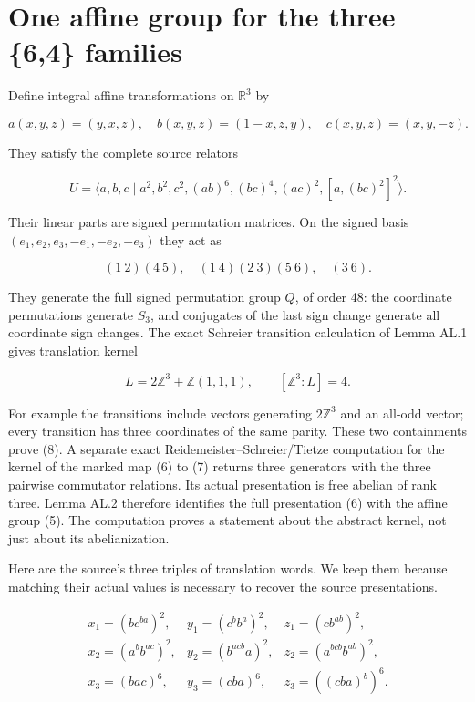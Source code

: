 \section{One affine group for the three \{6,4\} families}\label{one-affine-group-for-the-three-64-families}

Define integral affine transformations on \(\mathbb R^3\) by

\[a(x,y,z)=(y,x,z),\quad b(x,y,z)=(1-x,z,y),\quad
c(x,y,z)=(x,y,-z).\tag{5}\]

They satisfy the complete source relators

\[U=\langle a,b,c\mid a^2,b^2,c^2,(ab)^6,(bc)^4,(ac)^2,
[a,(bc)^2]^2\rangle.\tag{6}\]

Their linear parts are signed permutation matrices. On the signed basis
\((e_1,e_2,e_3,-e_1,-e_2,-e_3)\) they act as

\[ (1\ 2)(4\ 5),\quad(1\ 4)(2\ 3)(5\ 6),\quad(3\ 6).\tag{7}\]

They generate the full signed permutation group \(Q\), of order 48:
the coordinate permutations generate \(S_3\), and conjugates of the last
sign change generate all coordinate sign changes. The exact Schreier
transition calculation of Lemma AL.1 gives translation kernel

\[L=2\mathbb Z^3+\mathbb Z(1,1,1),\qquad[\mathbb Z^3:L]=4.\tag{8}\]

For example the transitions include vectors generating \(2\mathbb Z^3\)
and an all-odd vector; every transition has three coordinates of the
same parity. These two containments prove (8). A separate exact
Reidemeister--Schreier/Tietze computation for the kernel of the marked
map (6) to (7) returns three generators with the three pairwise
commutator relations. Its actual presentation is free abelian of rank
three. Lemma AL.2 therefore identifies the full presentation (6) with
the affine group (5). The computation proves a statement about the
abstract kernel, not just about its abelianization.

Here are the source's three triples of translation words. We keep them
because matching their actual values is necessary to recover the source
presentations.

\[\begin{array}{lll}
x_1=(b c^{ba})^2,&y_1=(c^b b^a)^2,&z_1=(c b^{ab})^2,\\
x_2=(a^b b^{ac})^2,&y_2=(b^{acb}a)^2,&z_2=(a^{bcb}b^{ab})^2,\\
x_3=(bac)^6,&y_3=(cba)^6,&z_3=((cba)^b)^6.
\end{array}\tag{9}\]

